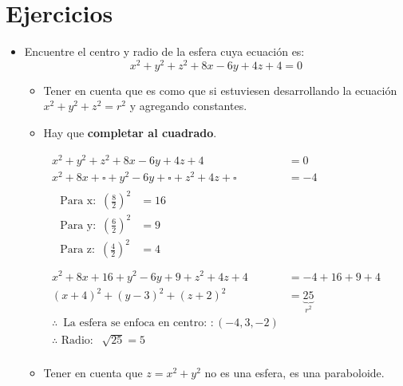 \section{Ejercicios}
\begin{itemize}
    \item Encuentre el centro y radio de la esfera cuya ecuación es: 
        \[
            x^2+y^2+z^2+8x-6y+4z+4=0
        \]
        \begin{itemize}
            \item Tener en cuenta que es como que si estuviesen desarrollando la ecuación $x^2+y^2+z^2=r^2$ y agregando constantes.
            \item Hay que \textbf{completar al cuadrado}.
        \end{itemize}

        \begin{center}
            \begin{align*}
                x^2+y^2+z^2+8x-6y+4z+4&=0 \\ 
                x^2+8x+\square+y^2-6y+\square+z^2+4z+\square&=-4 \\ 
                \begin{matrix}
                    \text{  Para x:  }\, \left(\frac{8}{2}\right)^2 &= 16 \\ 
                    \text{  Para y:  }\, \left( \frac{6}{2}  \right)^2 &= 9 \\ 
                    \text{  Para z:  }\, \left(\frac{4}{2}\right)^2 &= 4 \\ 
                \end{matrix} \\ 
                x^2+8x+16+y^2-6y+9+z^2+4z+4&= -4 +16+9+4\\
                (x+4)^2+(y-3)^2+(z+2)^2&= \underbrace{25}_{r^2} \\ 
                \therefore \, \text{  La esfera se enfoca en centro:  }: (-4,3,-2) \\ 
                \therefore \text{  Radio:  } \, \sqrt[]{25}=5 \\ 
            \end{align*}
        \end{center}
        
        \begin{itemize}
            \item Tener en cuenta que $z=x^2+y^2$ no es una esfera, es una paraboloide.
        \end{itemize}
    

\end{itemize}
